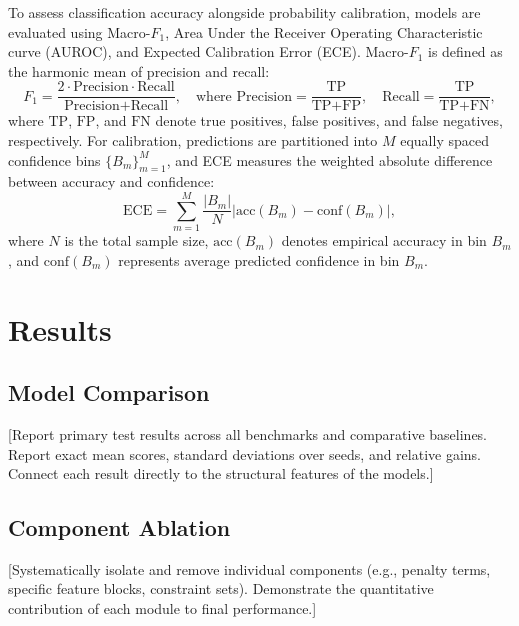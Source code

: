 \documentclass[a4paper,fleqn]{cas-sc}
\begin{document}
To assess classification accuracy alongside probability calibration, models are evaluated using Macro-$F_1$, Area Under the Receiver Operating Characteristic curve (AUROC), and Expected Calibration Error (ECE). Macro-$F_1$ is defined as the harmonic mean of precision and recall:
\begin{equation}
  F_1 = \frac{2 \cdot \text{Precision} \cdot \text{Recall}}{\text{Precision} + \text{Recall}}, \quad
  \text{where } \text{Precision} = \frac{\text{TP}}{\text{TP} + \text{FP}}, \quad \text{Recall} = \frac{\text{TP}}{\text{TP} + \text{FN}},
\end{equation}
where $\text{TP}$, $\text{FP}$, and $\text{FN}$ denote true positives, false positives, and false negatives, respectively. For calibration, predictions are partitioned into $M$ equally spaced confidence bins $\{B_m\}_{m=1}^M$, and ECE measures the weighted absolute difference between accuracy and confidence:
\begin{equation}
  \text{ECE} = \sum_{m=1}^{M} \frac{|B_m|}{N} \left| \text{acc}(B_m) - \text{conf}(B_m) \right|,
\end{equation}
where $N$ is the total sample size, $\text{acc}(B_m)$ denotes empirical accuracy in bin $B_m$, and $\text{conf}(B_m)$ represents average predicted confidence in bin $B_m$.

\section{Results}\label{sec:results}

\subsection{Model Comparison}
[Report primary test results across all benchmarks and comparative baselines. Report exact mean scores, standard deviations over seeds, and relative gains. Connect each result directly to the structural features of the models.]

\subsection{Component Ablation}
[Systematically isolate and remove individual components (e.g., penalty terms, specific feature blocks, constraint sets). Demonstrate the quantitative contribution of each module to final performance.]
\end{document}
